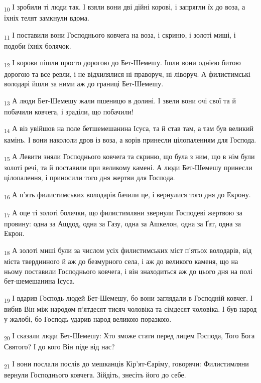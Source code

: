 \begin{tcolorbox}
\textsubscript{10} І зробили ті люди так. І взяли вони дві дійні корові, і запрягли їх до воза, а їхніх телят замкнули вдома.
\end{tcolorbox}
\begin{tcolorbox}
\textsubscript{11} І поставили вони Господнього ковчега на воза, і скриню, і золоті миші, і подоби їхніх болячок.
\end{tcolorbox}
\begin{tcolorbox}
\textsubscript{12} І корови пішли просто дорогою до Бет-Шемешу. Ішли вони однією битою дорогою та все ревли, і не відхилялися ні праворуч, ні ліворуч. А филистимські володарі йшли за ними аж до границі Бет-Шемешу.
\end{tcolorbox}
\begin{tcolorbox}
\textsubscript{13} А люди Бет-Шемешу жали пшеницю в долині. І звели вони очі свої та й побачили ковчега, і зраділи, що побачили!
\end{tcolorbox}
\begin{tcolorbox}
\textsubscript{14} А віз увійшов на поле бетшемешанина Ісуса, та й став там, а там був великий камінь. І вони накололи дров із воза, а корів принесли цілопаленням для Господа.
\end{tcolorbox}
\begin{tcolorbox}
\textsubscript{15} А Левити зняли Господнього ковчега та скриню, що була з ним, що в нім були золоті речі, та й поставили при великому камені. А люди Бет-Шемешу принесли цілопалення, і приносили того дня жертви для Господа.
\end{tcolorbox}
\begin{tcolorbox}
\textsubscript{16} А п'ять филистимських володарів бачили це, і вернулися того дня до Екрону.
\end{tcolorbox}
\begin{tcolorbox}
\textsubscript{17} А оце ті золоті болячки, що филистимляни звернули Господеві жертвою за провину: одна за Ашдод, одна за Газу, одна за Ашкелон, одна за Ґат, одна за Екрон.
\end{tcolorbox}
\begin{tcolorbox}
\textsubscript{18} А золоті миші були за числом усіх филистимських міст п'ятьох володарів, від міста твердинного й аж до безмурного села, і аж до великого каменя, що на ньому поставили Господнього ковчега, і він знаходиться аж до цього дня на полі бет-шемешанина Ісуса.
\end{tcolorbox}
\begin{tcolorbox}
\textsubscript{19} І вдарив Господь людей Бет-Шемешу, бо вони заглядали в Господній ковчег. І вибив Він між народом п'ятдесят тисяч чоловіка та сімдесят чоловіка. І був народ у жалобі, бо Господь ударив народ великою поразкою.
\end{tcolorbox}
\begin{tcolorbox}
\textsubscript{20} І сказали люди Бет-Шемешу: Хто зможе стати перед лицем Господа, Того Бога Святого? І до кого Він піде від нас?
\end{tcolorbox}
\begin{tcolorbox}
\textsubscript{21} І вони послали послів до мешканців Кір'ят-Єаріму, говорячи: Филистимляни вернули Господнього ковчега. Зійдіть, знесіть його до себе.
\end{tcolorbox}
